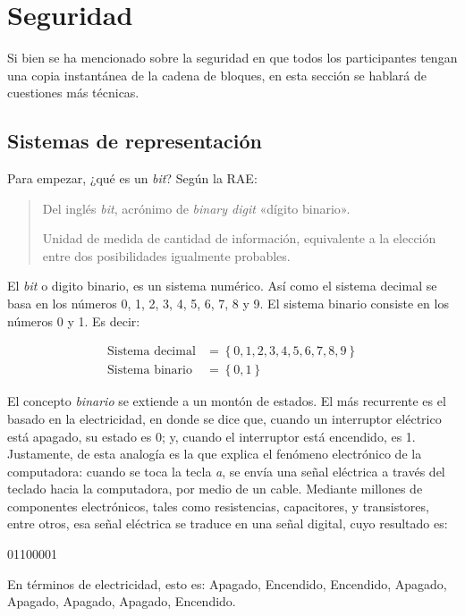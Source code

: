 \documentclass[12pt,a4paper,twoside]{book}
\begin{document}
\section{Seguridad}
Si bien se ha mencionado sobre la seguridad en que todos los participantes tengan una copia instantánea de la cadena de bloques, en esta sección se hablará de cuestiones más técnicas.

\subsection{Sistemas de representación}
Para empezar, ¿qué es un \textit{bit}? Según la RAE:

\begin{quotation}
Del inglés \textit{bit}, acrónimo de \textit{binary digit} «dígito binario».

Unidad de medida de cantidad de información, equivalente a la elección entre dos posibilidades igualmente probables. \cite{rae}
\end{quotation}

El \textit{bit} o digito binario, es un sistema numérico. Así como el sistema decimal se basa en los números 0, 1, 2, 3, 4, 5, 6, 7, 8 y 9. El sistema binario consiste en los números 0 y 1. Es decir:

\begin{align*}
\text{Sistema decimal} &= \left\lbrace 0, 1, 2, 3, 4, 5, 6, 7, 8, 9 \right\rbrace \\
\text{Sistema binario} &= \left\lbrace 0, 1 \right\rbrace
\end{align*}

El concepto \textit{binario} se extiende a un montón de estados. El más recurrente es el basado en la electricidad, en donde se dice que, cuando un interruptor eléctrico está apagado, su estado es 0; y, cuando el interruptor está encendido, es 1. Justamente, de esta analogía es la que explica el fenómeno electrónico de la computadora: cuando se toca la tecla \textit{a}, se envía una señal eléctrica a través del teclado hacia la computadora, por medio de un cable. Mediante millones de componentes electrónicos, tales como resistencias, capacitores, y transistores, entre otros, esa señal eléctrica se traduce en una señal digital, cuyo resultado es:

\begin{center}
01100001
\end{center}

En términos de electricidad, esto es: Apagado, Encendido, Encendido, Apagado, Apagado, Apagado, Apagado, Encendido.
\end{document}

